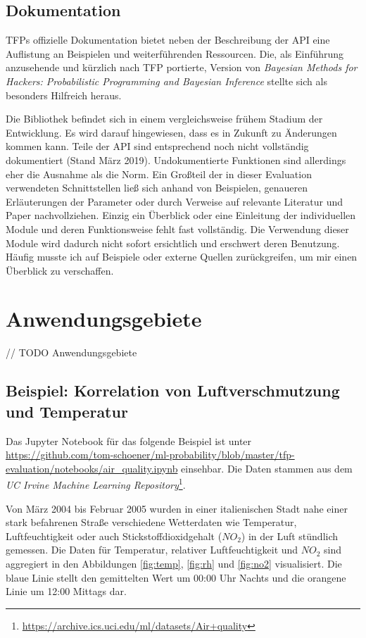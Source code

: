 \documentclass[12pt]{article}
\begin{document}
\subsection{Dokumentation}
TFPs offizielle Dokumentation bietet neben der Beschreibung der API eine Auflistung an Beispielen und weiterführenden Ressourcen. Die, als Einführung anzusehende und kürzlich nach TFP portierte, Version von \textit{Bayesian Methods for Hackers: Probabilistic Programming and Bayesian Inference}\cite{Davidson-Pilon2015} stellte sich als besonders Hilfreich heraus.

Die Bibliothek befindet sich in einem vergleichsweise frühem Stadium der Entwicklung. Es wird darauf hingewiesen, dass es in Zukunft zu Änderungen kommen kann. Teile der API sind entsprechend noch nicht vollständig dokumentiert (Stand März 2019).
Undokumentierte Funktionen sind allerdings eher die Ausnahme als die Norm. Ein Großteil der in dieser Evaluation verwendeten Schnittstellen ließ sich anhand von Beispielen, genaueren Erläuterungen der Parameter oder durch Verweise auf relevante Literatur und Paper nachvollziehen. Einzig ein Überblick oder eine Einleitung der individuellen Module und deren Funktionsweise fehlt fast vollständig. Die Verwendung dieser Module wird dadurch nicht sofort ersichtlich und erschwert deren Benutzung. Häufig musste ich auf Beispiele oder externe Quellen zurückgreifen, um mir einen Überblick zu verschaffen.

\section{Anwendungsgebiete}

// TODO Anwendungsgebiete

\subsection{Beispiel: Korrelation von Luftverschmutzung und Temperatur}
\label{sec:example_air_quality}

Das Jupyter Notebook für das folgende Beispiel ist unter \url{https://github.com/tom-schoener/ml-probability/blob/master/tfp-evaluation/notebooks/air_quality.ipynb} einsehbar. Die Daten stammen aus dem \textit{UC Irvine Machine Learning Repository}\footnote{\url{https://archive.ics.uci.edu/ml/datasets/Air+quality}}.

Von März 2004 bis Februar 2005 wurden in einer italienischen Stadt nahe einer stark befahrenen Straße verschiedene Wetterdaten wie Temperatur, Luftfeuchtigkeit oder auch Stickstoffdioxidgehalt ($NO_2$) in der Luft stündlich gemessen. Die Daten für Temperatur, relativer Luftfeuchtigkeit und $NO_2$ sind aggregiert in den Abbildungen \ref{fig:temp}, \ref{fig:rh} und \ref{fig:no2} visualisiert. Die blaue Linie stellt den gemittelten Wert um 00:00 Uhr Nachts und die orangene Linie um 12:00 Mittags dar.
\end{document}
